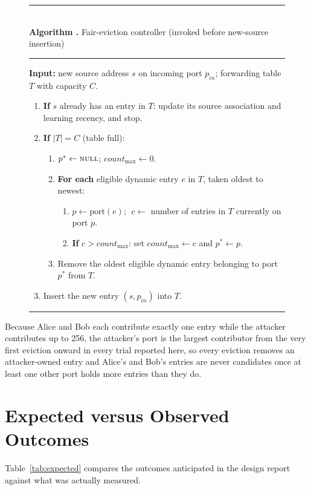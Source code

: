 \documentclass[10pt,a4paper]{article}
\newcounter{algctr}
\newenvironment{algobox}[1]{%
\begin{figure}[H]\refstepcounter{algctr}\centering
\begin{minipage}{\linewidth}
\noindent\rule{\linewidth}{0.7pt}\\[2pt]
\textbf{Algorithm \thealgctr.} #1\\[3pt]
\noindent\rule{\linewidth}{0.4pt}\vspace{4pt}\par
\small
}{%
\vspace{2pt}\noindent\rule{\linewidth}{0.7pt}
\end{minipage}
\end{figure}
}
\begin{document}
\begin{algobox}{Fair-eviction controller (invoked before new-source insertion)}
\label{alg:fair-eviction}
\textbf{Input:} new source address $s$ on incoming port $p_{in}$; forwarding table $T$ with capacity $C$.
\begin{enumerate}
\item \textbf{If} $s$ already has an entry in $T$: update its source association and learning recency, and stop.
\item \textbf{If} $|T| = C$ (table full):
\begin{enumerate}
\item $p^{*} \leftarrow \textsc{null}$; $\mathit{count}_{\max} \leftarrow 0$.
\item \textbf{For each} eligible dynamic entry $e$ in $T$, taken oldest to newest:
\begin{enumerate}
\item $p \leftarrow \mathrm{port}(e)$; $\;c \leftarrow$ number of entries in $T$ currently on port $p$.
\item \textbf{If} $c > \mathit{count}_{\max}$: set $\mathit{count}_{\max} \leftarrow c$ and $p^{*} \leftarrow p$.
\end{enumerate}
\item Remove the oldest eligible dynamic entry belonging to port $p^{*}$ from $T$.
\end{enumerate}
\item Insert the new entry $(s, p_{in})$ into $T$.
\end{enumerate}
\end{algobox}

Because Alice and Bob each contribute exactly one entry while the attacker contributes up to 256, the attacker's port is the largest contributor from the very first eviction onward in every trial reported here, so every eviction removes an attacker-owned entry and Alice's and Bob's entries are never candidates once at least one other port holds more entries than they do.

\section{Expected versus Observed Outcomes}
Table~\ref{tab:expected} compares the outcomes anticipated in the design report against what was actually measured.
\end{document}
